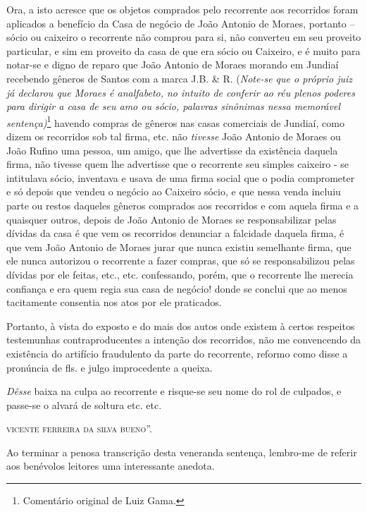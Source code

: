 {Ora, a isto acresce que os objetos comprados pelo recorrente aos
recorridos foram aplicados a benefício da Casa de negócio de João
Antonio de Moraes, portanto -- sócio ou caixeiro o recorrente não
comprou para si, não converteu em seu proveito particular, e sim em
proveito da casa de que era sócio ou Caixeiro, e é muito para notar-se e
digno de reparo que João Antonio de Moraes morando em Jundiaí recebendo
gêneros de Santos com a marca J.B. \& R. (\emph{Note-se que o próprio
juiz já declarou que Moraes é analfabeto, no intuito de conferir ao réu
plenos poderes para dirigir a casa de seu amo ou sócio, palavras
sinônimas nessa memorável sentença)}\footnote{ Comentário original de
  Luiz Gama.} havendo compras de gêneros nas casas comerciais de
Jundiaí, como dizem os recorridos sob tal firma, etc. não \emph{tivesse}
João Antonio de Moraes ou João Rufino uma pessoa, um amigo, que lhe
advertisse da existência daquela firma, não tivesse quem lhe advertisse
que o recorrente seu simples caixeiro - se intitulava sócio, inventava e
usava de uma firma social que o podia comprometer e só depois que vendeu
o negócio ao Caixeiro sócio, e que nessa venda incluiu parte ou restos
daqueles gêneros comprados aos recorridos e com aquela firma e a
quaisquer outros, depois de João Antonio de Moraes se responsabilizar
pelas dívidas da casa é que vem os recorridos denunciar a falcidade
daquela firma, é que vem João Antonio de Moraes jurar que nunca existiu
semelhante firma, que ele nunca autorizou o recorrente a fazer compras,
que só se responsabilizou pelas dívidas por ele feitas, etc., etc.
confessando, porém, que o recorrente lhe merecia confiança e era quem
regia sua casa de negócio! donde se conclui que ao menos tacitamente
consentia nos atos por ele praticados.

Portanto, à vista do exposto e do mais dos autos onde existem à certos
respeitos testemunhas contraproducentes a intenção dos recorridos, não
me convencendo da existência do artifício fraudulento da parte do
recorrente, reformo como disse a pronúncia de fls. e julgo improcedente
a queixa.

\emph{Dêsse} baixa na culpa ao recorrente e risque-se seu nome do rol de
culpados, e passe-se o alvará de soltura etc. etc.
\begin{flushright}
\textsc{vicente ferreira da silva bueno}''.
\end{flushright}
\asterisc{}

Ao terminar a penosa transcrição desta veneranda sentença, lembro-me de
referir aos benévolos leitores uma interessante anedota.

}
